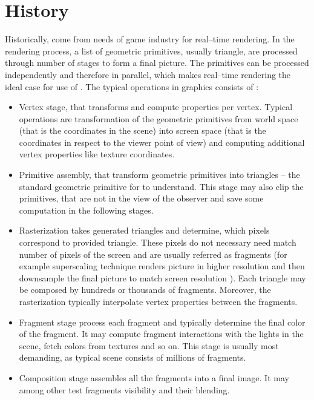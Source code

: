\section{History}

Historically, \gpu come from needs of game industry for real--time rendering. In the rendering process, a list of geometric primitives, usually triangle, are processed through number of stages to form a final picture. The primitives can be processed independently and therefore in parallel, which makes real--time rendering the ideal case for use of \gpu. The typical operations in graphics consists of \citep{GPUComputingOwens}:
\begin{itemize}
    \item Vertex stage, that transforms and compute properties per vertex. Typical operations are transformation of the geometric primitives from world space (that is the coordinates in the scene) into screen space (that is the coordinates in respect to the viewer point of view) and computing additional vertex properties like texture coordinates.
    \item Primitive assembly, that transform geometric primitives into triangles -- the standard geometric primitive for \gpu to understand. This stage may also clip the primitives, that are not in the view of the observer and save some computation in the following stages.
    \item Rasterization takes generated triangles and determine, which pixels correspond to provided triangle. These pixels do not necessary need match number of pixels of the screen and are usually referred as fragments (for example superscaling technique renders picture in higher resolution and then downsample the final picture to match screen resolution \citep{GameGraphicProgramming}). Each triangle may be composed by hundreds or thousands of fragments. Moreover, the rasterization typically interpolate vertex properties between the fragments.
    \item Fragment stage process each fragment and typically determine the final color of the fragment. It may compute fragment interactions with the lights in the scene, fetch colors from textures and so on. This stage is usually most demanding, as typical scene consists of millions of fragments.
    \item Composition stage assembles all the fragments into a final image. It may among other test fragments visibility and their blending.
\end{itemize}

